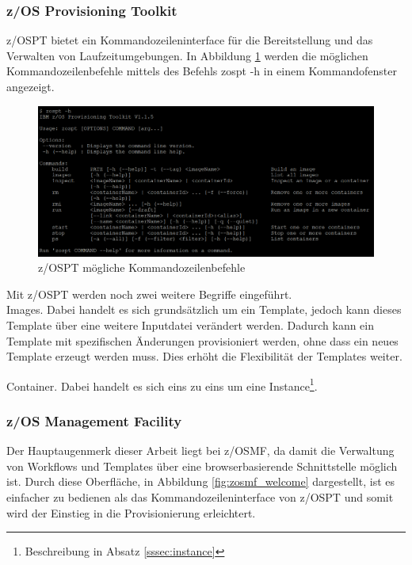 \subsubsection{z/OS Provisioning Toolkit}\label{sssec:zospt}
z/OSPT bietet ein Kommandozeileninterface für die Bereitstellung und das Verwalten von Laufzeitumgebungen.
In Abbildung \ref{fig:zospt_help} werden die möglichen Kommandozeilenbefehle mittels des Befehls \glqq zospt -h\grqq{} in einem Kommandofenster angezeigt.
\begin{figure}[h]
	\centering
	\includegraphics[width=\textwidth]{figures/zospt_help_putty.png}
	\caption{z/OSPT mögliche Kommandozeilenbefehle}
	\label{fig:zospt_help}
\end{figure}
Mit z/OSPT werden noch zwei weitere Begriffe eingeführt.\\
\glqq Images\grqq{}.
Dabei handelt es sich grundsätzlich um ein Template, jedoch kann dieses Template über eine weitere Inputdatei verändert werden.
Dadurch kann ein Template mit spezifischen Änderungen provisioniert werden, ohne dass ein neues Template erzeugt werden muss.
Dies erhöht die Flexibilität der Templates weiter.

\glqq Container\grqq{}.
Dabei handelt es sich eins zu eins um eine \glqq Instance\grqq \footnote{Beschreibung in Absatz \ref{sssec:instance}}.
\cite{IBM.2019b}

\subsubsection{z/OS Management Facility}\label{sssec:zosmf}
Der Hauptaugenmerk dieser Arbeit liegt  bei z/OSMF, da damit die Verwaltung von Workflows und Templates über eine browserbasierende Schnittstelle möglich ist.
Durch diese Oberfläche, in Abbildung \ref{fig:zosmf_welcome} dargestellt, ist es einfacher zu bedienen als das Kommandozeileninterface von z/OSPT  und somit wird der Einstieg in die Provisionierung erleichtert.

